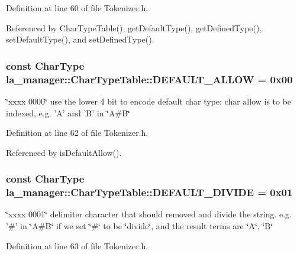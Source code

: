 Definition at line 60 of file Tokenizer.h.

Referenced by CharTypeTable(), getDefaultType(), getDefinedType(), setDefaultType(), and setDefinedType().\hypertarget{classla__manager_1_1CharTypeTable_f3e49258e07d5f67515de16598ef70b3}{
\subsubsection[{DEFAULT\_\-ALLOW}]{\setlength{\rightskip}{0pt plus 5cm}const {\bf CharType} {\bf la\_\-manager::CharTypeTable::DEFAULT\_\-ALLOW} = 0x00}}
\label{classla__manager_1_1CharTypeTable_f3e49258e07d5f67515de16598ef70b3}


\char`\"{}xxxx 0000\char`\"{} use the lower 4 bit to encode default char type: char allow is to be indexed, e.g. 'A' and 'B' in \char`\"{}A\#B\char`\"{} 



Definition at line 62 of file Tokenizer.h.

Referenced by isDefaultAllow().\hypertarget{classla__manager_1_1CharTypeTable_3e1273a73ef3b0f495c08b53e0fb17ce}{
\subsubsection[{DEFAULT\_\-DIVIDE}]{\setlength{\rightskip}{0pt plus 5cm}const {\bf CharType} {\bf la\_\-manager::CharTypeTable::DEFAULT\_\-DIVIDE} = 0x01}}
\label{classla__manager_1_1CharTypeTable_3e1273a73ef3b0f495c08b53e0fb17ce}


\char`\"{}xxxx 0001\char`\"{} delimiter character that should removed and divide the string. e.g. '\#' in \char`\"{}A\#B\char`\"{} if we set \char`\"{}\#\char`\"{} to be \char`\"{}divide\char`\"{}, and the result terms are \char`\"{}A\char`\"{}, \char`\"{}B\char`\"{} 



Definition at line 63 of file Tokenizer.h.


